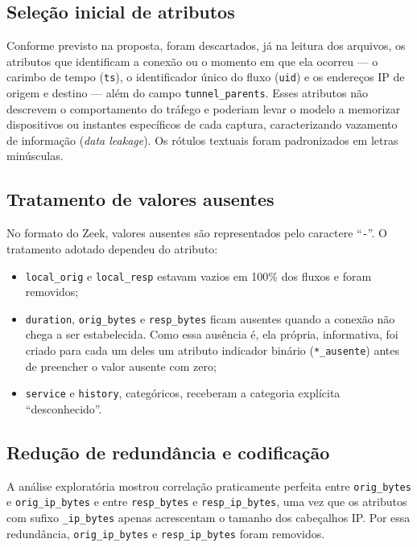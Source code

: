 \subsection{Seleção inicial de atributos}

Conforme previsto na proposta, foram descartados, já na leitura dos arquivos, os atributos que identificam a conexão ou o momento em que ela ocorreu --- o carimbo de tempo (\texttt{ts}), o identificador único do fluxo (\texttt{uid}) e os endereços IP de origem e destino --- além do campo \texttt{tunnel\_parents}. Esses atributos não descrevem o comportamento do tráfego e poderiam levar o modelo a memorizar dispositivos ou instantes específicos de cada captura, caracterizando vazamento de informação (\textit{data leakage}). Os rótulos textuais foram padronizados em letras minúsculas.

\subsection{Tratamento de valores ausentes}

No formato do Zeek, valores ausentes são representados pelo caractere ``\texttt{-}''. O tratamento adotado dependeu do atributo:
\begin{itemize}
    \item \texttt{local\_orig} e \texttt{local\_resp} estavam vazios em 100\% dos fluxos e foram removidos;
    \item \texttt{duration}, \texttt{orig\_bytes} e \texttt{resp\_bytes} ficam ausentes quando a conexão não chega a ser estabelecida. Como essa ausência é, ela própria, informativa, foi criado para cada um deles um atributo indicador binário (\texttt{*\_ausente}) antes de preencher o valor ausente com zero;
    \item \texttt{service} e \texttt{history}, categóricos, receberam a categoria explícita ``desconhecido''.
\end{itemize}

\subsection{Redução de redundância e codificação}

A análise exploratória mostrou correlação praticamente perfeita entre \texttt{orig\_bytes} e \texttt{orig\_ip\_bytes} e entre \texttt{resp\_bytes} e \texttt{resp\_ip\_bytes}, uma vez que os atributos com sufixo \texttt{\_ip\_bytes} apenas acrescentam o tamanho dos cabeçalhos IP. Por essa redundância, \texttt{orig\_ip\_bytes} e \texttt{resp\_ip\_bytes} foram removidos.

